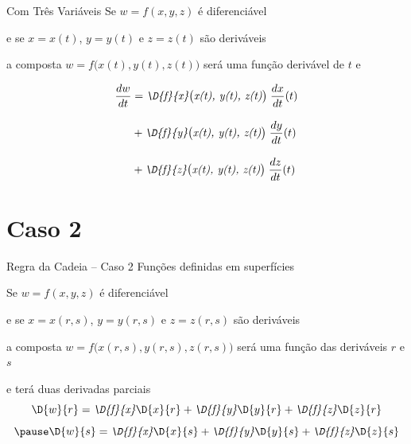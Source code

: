 \documentclass[fleqn,utf8,aspectratio=169,12pt,ignorenonframetext]{beamer}
\begin{document}
\begin{frame}{Com Três Variáveis}
    Se \(w=f(x, y, z)\) é diferenciável

    \pause
     e se \(x=x(t)\), \(y=y(t)\) e \(z=z(t)\) são deriváveis

    \pause
    a composta \(w=f\big(x(t), y(t), z(t)\big)\) será uma função derivável de $t$ e

    \pause
    \begin{align*}
        \frac{dw}{dt}
        & = \emph{\D{f}{x}\big(x(t), y(t), z(t)\big)} \; \frac{dx}{dt}(t) \\[3mm]
        & + \emph{\D{f}{y}\big(x(t), y(t), z(t)\big)} \; \frac{dy}{dt}(t) \\[3mm]
        & + \emph{\D{f}{z}\big(x(t), y(t), z(t)\big)} \; \frac{dz}{dt}(t)
    \end{align*}
\end{frame}


\section{Caso 2}

\begin{frame}{Regra da Cadeia -- Caso 2 }
    Funções definidas em superfícies
    \vspace{0.5\baselineskip}

    \pause
    Se \(w=f(x, y, z)\) é diferenciável

    \pause
    e se \(x=x(r, s)\), \(y=y(r, s)\) e \(z=z(r, s)\) são deriváveis

    \pause
    a composta \(w=f\big(x(r, s), y(r, s), z(r, s)\big)\)
    será uma função das deriváveis $r$ e $s$

    \pause
    e terá duas derivadas parciais
    \[
        \D{w}{r}
        = \emph{\D{f}{x}} \D{x}{r}
        + \emph{\D{f}{y}} \D{y}{r}
        + \emph{\D{f}{z}} \D{z}{r}
    \]
    \[
        \pause
        \D{w}{s}
        = \emph{\D{f}{x}} \D{x}{s}
        + \emph{\D{f}{y}} \D{y}{s}
        + \emph{\D{f}{z}} \D{z}{s}
    \]
\end{frame}

\end{document}
